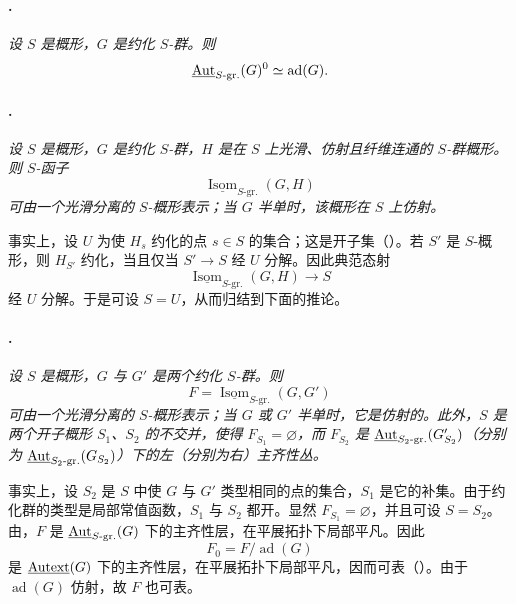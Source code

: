 \paragraph{.}
\emph{设 \(S\) 是概形，\(G\) 是约化 \(S\)-群。则}
\[
  \underline{\operatorname{Aut}}_{S\text{-}\mathrm{gr.}}(G)^0
  \simeq\operatorname{ad}(G).
\]

\paragraph{.}
\emph{设 \(S\) 是概形，\(G\) 是约化 \(S\)-群，\(H\) 是在 \(S\) 上光滑、仿射且纤维连通的 \(S\)-群概形。则 \(S\)-函子}
\[
  \underline{\operatorname{Isom}}_{S\text{-}\mathrm{gr.}}(G,H)
\]
\emph{可由一个光滑分离的 \(S\)-概形表示；当 \(G\) 半单时，该概形在 \(S\) 上仿射。}

事实上，设 \(U\) 为使 \(H_s\) 约化的点 \(s\in S\) 的集合；这是开子集（）。若 \(S'\) 是 \(S\)-概形，则 \(H_{S'}\) 约化，当且仅当 \(S'\to S\) 经 \(U\) 分解。因此典范态射
\[
  \underline{\operatorname{Isom}}_{S\text{-}\mathrm{gr.}}(G,H)
  \longrightarrow S
\]
经 \(U\) 分解。于是可设 \(S=U\)，从而归结到下面的推论。

\paragraph{.}
\emph{设 \(S\) 是概形，\(G\) 与 \(G'\) 是两个约化 \(S\)-群。则}
\[
  F=\underline{\operatorname{Isom}}_{S\text{-}\mathrm{gr.}}(G,G')
\]
\emph{可由一个光滑分离的 \(S\)-概形表示；当 \(G\) 或 \(G'\) 半单时，它是仿射的。此外，\(S\) 是两个开子概形 \(S_1\)、\(S_2\) 的不交并，使得 \(F_{S_1}=\varnothing\)，而 \(F_{S_2}\) 是 \(\underline{\operatorname{Aut}}_{S_2\text{-}\mathrm{gr.}}(G'_{S_2})\)（分别为 \(\underline{\operatorname{Aut}}_{S_2\text{-}\mathrm{gr.}}(G_{S_2})\)）下的左（分别为右）主齐性丛。}

事实上，设 \(S_2\) 是 \(S\) 中使 \(G\) 与 \(G'\) 类型相同的点的集合，\(S_1\) 是它的补集。由于约化群的类型是局部常值函数，\(S_1\) 与 \(S_2\) 都开。显然 \(F_{S_1}=\varnothing\)，并且可设 \(S=S_2\)。由，\(F\) 是 \(\underline{\operatorname{Aut}}_{S\text{-}\mathrm{gr.}}(G)\) 下的主齐性层，在平展拓扑下局部平凡。因此
\[
  F_0=F/\operatorname{ad}(G)
\]
是 \(\underline{\operatorname{Autext}}(G)\) 下的主齐性层，在平展拓扑下局部平凡，因而可表（）。由于 \(\operatorname{ad}(G)\) 仿射，故 \(F\) 也可表。

